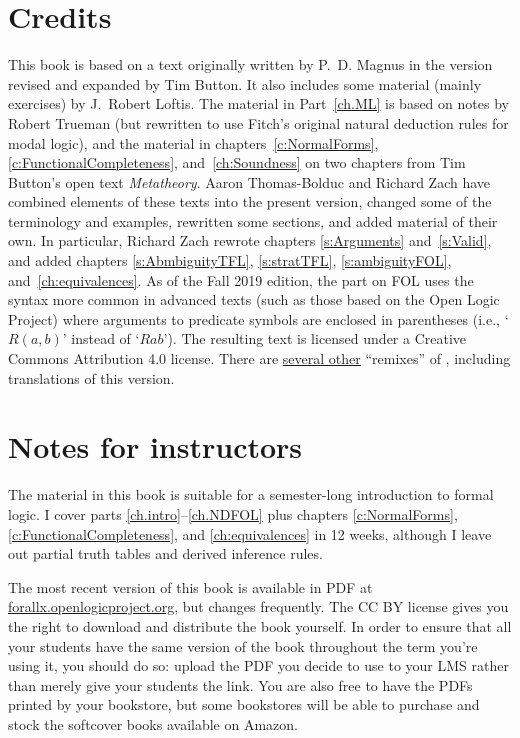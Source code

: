 \section{Credits} This book is based on a text originally written by P.~D. Magnus in the version revised and expanded by Tim Button. It also includes some material (mainly exercises) by J.~Robert Loftis. The material in Part~\ref{ch.ML} is based on notes by Robert Trueman (but rewritten to use Fitch's original natural deduction rules for modal logic), and the material in chapters~\ref{c:NormalForms}, \ref{c:FunctionalCompleteness}, and~\ref{ch:Soundness} on two chapters from Tim Button's open text \textit{Metatheory}. Aaron Thomas-Bolduc and Richard Zach have combined elements of these texts into the present version, changed some of the terminology and examples, rewritten some sections, and added material of their own.  In particular, Richard Zach rewrote chapters \ref{s:Arguments} and~\ref{s:Valid}, and added chapters \ref{s:AbmbiguityTFL}, \ref{s:stratTFL}, \ref{s:ambiguityFOL}, and~\ref{ch:equivalences}. As of the Fall 2019 edition, the part on FOL uses the syntax more common in advanced texts (such as those based on the Open Logic Project) where arguments to predicate symbols are enclosed in parentheses (i.e., `$R(a,b)$' instead of `$Rab$'). The resulting text is licensed under a Creative Commons Attribution 4.0 license. There are \href{https://github.com/OpenLogicProject/OpenLogic/wiki/Other-Logic-Textbooks}{several other} ``remixes'' of \forallx, including translations of this version.

\section{Notes for instructors} The material in this book is suitable for a semester-long introduction to formal logic. I cover parts \ref{ch.intro}--\ref{ch.NDFOL} plus chapters \ref{c:NormalForms}, \ref{c:FunctionalCompleteness}, and \ref{ch:equivalences} in 12 weeks, although I leave out partial truth tables and derived inference rules.

The most recent version of this book is available in PDF at \href{https://forallx.openlogicproject.org}{forallx.openlogicproject.org}, but changes frequently.  The CC BY license gives you the right to download and distribute the book yourself. In order to ensure that all your students have the same version of the book throughout the term you're using it, you should do so: upload the PDF you decide to use to your LMS rather than merely give your students the link. You are also free to have the PDFs printed by your bookstore, but some bookstores will be able to purchase and stock the softcover books available on Amazon.

